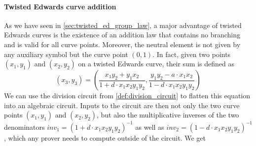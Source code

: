 \paragraph{Twisted Edwards curve addition} As we have seen in \ref{sec:twisted_ed_group_law}, a major advantage of twisted Edwards curves is the existence of an addition law that contains no branching and is valid for all curve points. Moreover, the neutral element is not given by any auxiliary symbol but the curve point $(0,1)$. In fact, given two points $(x_1,y_1)$ and $(x_2,y_2)$ on a twisted Edwards curve, their sum is defined as
$$
(x_3,y_3) = \left(\frac{x_1y_2+y_1x_2}{1+d\cdot x_1x_2y_1y_2}, \frac{y_1y_2-a\cdot x_1x_2}{1-d\cdot x_1x_2y_1y_2}\right)
$$
We can use the division circuit from \ref{def:division_circuit} to flatten this equation into an algebraic circuit. Inputs to the circuit are then not only the two curve points $(x_1,y_1)$ and $(x_2,y_2)$, but also the multiplicative inverses of the two denominators $inv_1 = (1+d\cdot x_1x_2y_1y_2)^{-1}$ as well as $inv_2= (1-d\cdot x_1x_2y_1y_2)^{-1}$, which any prover needs to compute outside of the circuit. We get
